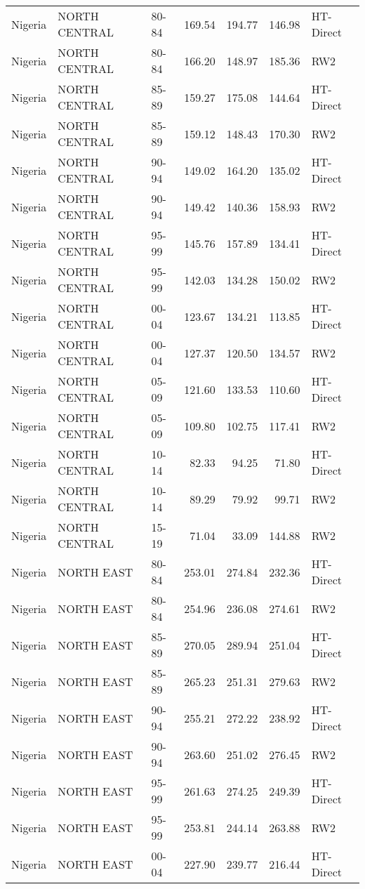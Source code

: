 \begin{longtable}{lllrrrl}
  Nigeria & NORTH CENTRAL & 80-84 & 169.54 & 194.77 & 146.98 & HT-Direct \\ 
  Nigeria & NORTH CENTRAL & 80-84 & 166.20 & 148.97 & 185.36 & RW2 \\ 
  Nigeria & NORTH CENTRAL & 85-89 & 159.27 & 175.08 & 144.64 & HT-Direct \\ 
  Nigeria & NORTH CENTRAL & 85-89 & 159.12 & 148.43 & 170.30 & RW2 \\ 
  Nigeria & NORTH CENTRAL & 90-94 & 149.02 & 164.20 & 135.02 & HT-Direct \\ 
  Nigeria & NORTH CENTRAL & 90-94 & 149.42 & 140.36 & 158.93 & RW2 \\ 
  Nigeria & NORTH CENTRAL & 95-99 & 145.76 & 157.89 & 134.41 & HT-Direct \\ 
  Nigeria & NORTH CENTRAL & 95-99 & 142.03 & 134.28 & 150.02 & RW2 \\ 
  Nigeria & NORTH CENTRAL & 00-04 & 123.67 & 134.21 & 113.85 & HT-Direct \\ 
  Nigeria & NORTH CENTRAL & 00-04 & 127.37 & 120.50 & 134.57 & RW2 \\ 
  Nigeria & NORTH CENTRAL & 05-09 & 121.60 & 133.53 & 110.60 & HT-Direct \\ 
  Nigeria & NORTH CENTRAL & 05-09 & 109.80 & 102.75 & 117.41 & RW2 \\ 
  Nigeria & NORTH CENTRAL & 10-14 & 82.33 & 94.25 & 71.80 & HT-Direct \\ 
  Nigeria & NORTH CENTRAL & 10-14 & 89.29 & 79.92 & 99.71 & RW2 \\ 
  Nigeria & NORTH CENTRAL & 15-19 & 71.04 & 33.09 & 144.88 & RW2 \\ 
  Nigeria & NORTH EAST & 80-84 & 253.01 & 274.84 & 232.36 & HT-Direct \\ 
  Nigeria & NORTH EAST & 80-84 & 254.96 & 236.08 & 274.61 & RW2 \\ 
  Nigeria & NORTH EAST & 85-89 & 270.05 & 289.94 & 251.04 & HT-Direct \\ 
  Nigeria & NORTH EAST & 85-89 & 265.23 & 251.31 & 279.63 & RW2 \\ 
  Nigeria & NORTH EAST & 90-94 & 255.21 & 272.22 & 238.92 & HT-Direct \\ 
  Nigeria & NORTH EAST & 90-94 & 263.60 & 251.02 & 276.45 & RW2 \\ 
  Nigeria & NORTH EAST & 95-99 & 261.63 & 274.25 & 249.39 & HT-Direct \\ 
  Nigeria & NORTH EAST & 95-99 & 253.81 & 244.14 & 263.88 & RW2 \\ 
  Nigeria & NORTH EAST & 00-04 & 227.90 & 239.77 & 216.44 & HT-Direct \\ 

\end{longtable}
